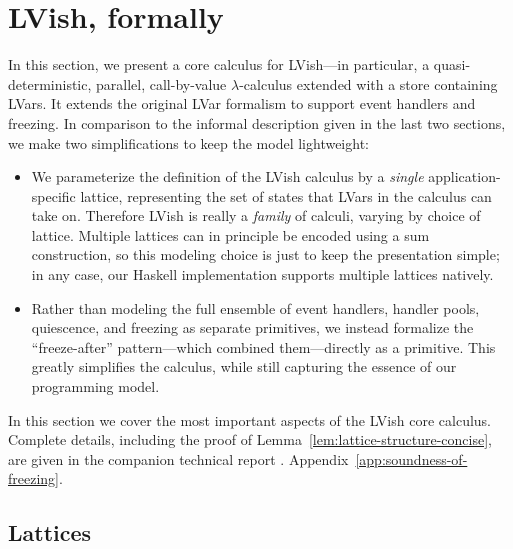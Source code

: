\section{LVish, formally}\label{s:quasi-formal}


In this section, we present a core calculus for LVish---in particular, a
quasi-deterministic, parallel, call-by-value $\lambda$-calculus extended with a
store containing LVars.  It extends the original LVar formalism to support event
handlers and freezing.  In comparison to the informal description given in the
last two sections, we make two simplifications to keep the model lightweight:
\begin{itemize}
\item We parameterize the definition of the LVish calculus by a \emph{single}
  application-specific lattice, representing the set of states that LVars in the
  calculus can take on. Therefore LVish is really a \emph{family} of
  calculi, varying by choice of lattice.  Multiple lattices can in principle be
  encoded using a sum construction, so this modeling choice is just to keep the
  presentation simple; in any case, our Haskell implementation supports multiple
  lattices natively.
\item Rather than modeling the full ensemble of event handlers, handler pools,
  quiescence, and freezing as separate primitives, we instead formalize the
  ``freeze-after'' pattern---which combined them---directly as a primitive.
  This greatly simplifies the calculus, while still capturing the
  essence of our programming model.
\end{itemize}

\noindent In this section we cover the most important aspects of the
LVish core calculus.  Complete details, including the proof of
Lemma~\ref{lem:lattice-structure-concise},
 are given in
\ifx\fulltr\undefined
the companion
technical report \cite{Freeze-TR}.
\else
Appendix~\ref{app:soundness-of-freezing}.
\fi

\subsection{Lattices}


